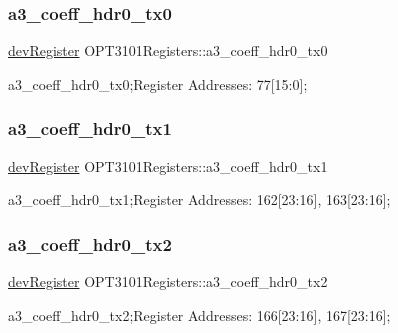 \subsubsection{\texorpdfstring{a3\+\_\+coeff\+\_\+hdr0\+\_\+tx0}{a3\_coeff\_hdr0\_tx0}}
{\footnotesize\ttfamily \mbox{\hyperlink{classdev_register}{dev\+Register}} O\+P\+T3101\+Registers\+::a3\+\_\+coeff\+\_\+hdr0\+\_\+tx0}



a3\+\_\+coeff\+\_\+hdr0\+\_\+tx0;Register Addresses\+: 77\mbox{[}15\+:0\mbox{]}; 

\mbox{\label{class_o_p_t3101_registers_a30c9afa928337c116a2ab0257cf6c9a0}} 
\subsubsection{\texorpdfstring{a3\+\_\+coeff\+\_\+hdr0\+\_\+tx1}{a3\_coeff\_hdr0\_tx1}}
{\footnotesize\ttfamily \mbox{\hyperlink{classdev_register}{dev\+Register}} O\+P\+T3101\+Registers\+::a3\+\_\+coeff\+\_\+hdr0\+\_\+tx1}



a3\+\_\+coeff\+\_\+hdr0\+\_\+tx1;Register Addresses\+: 162\mbox{[}23\+:16\mbox{]}, 163\mbox{[}23\+:16\mbox{]}; 

\mbox{\label{class_o_p_t3101_registers_a14387bafd3d67825868af4867f303ce7}} 
\subsubsection{\texorpdfstring{a3\+\_\+coeff\+\_\+hdr0\+\_\+tx2}{a3\_coeff\_hdr0\_tx2}}
{\footnotesize\ttfamily \mbox{\hyperlink{classdev_register}{dev\+Register}} O\+P\+T3101\+Registers\+::a3\+\_\+coeff\+\_\+hdr0\+\_\+tx2}



a3\+\_\+coeff\+\_\+hdr0\+\_\+tx2;Register Addresses\+: 166\mbox{[}23\+:16\mbox{]}, 167\mbox{[}23\+:16\mbox{]}; 


